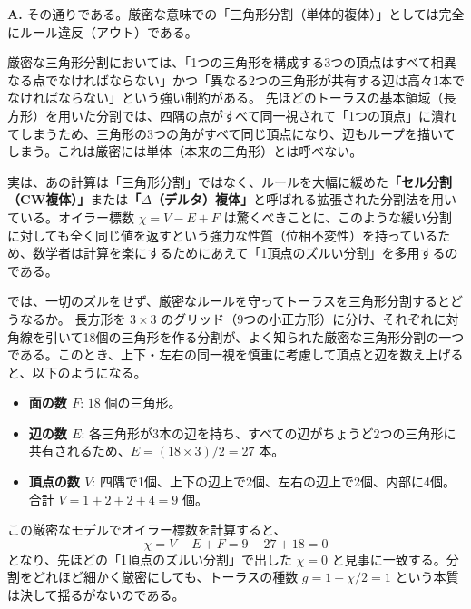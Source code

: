 \begin{Q}
\textbf{A.} その通りである。厳密な意味での「三角形分割（単体的複体）」としては完全にルール違反（アウト）である。

厳密な三角形分割においては、「1つの三角形を構成する3つの頂点はすべて相異なる点でなければならない」かつ「異なる2つの三角形が共有する辺は高々1本でなければならない」という強い制約がある。
先ほどのトーラスの基本領域（長方形）を用いた分割では、四隅の点がすべて同一視されて「1つの頂点」に潰れてしまうため、三角形の3つの角がすべて同じ頂点になり、辺もループを描いてしまう。これは厳密には単体（本来の三角形）とは呼べない。

実は、あの計算は「三角形分割」ではなく、ルールを大幅に緩めた\textbf{「セル分割（CW複体）」}または\textbf{「$\Delta$（デルタ）複体」}と呼ばれる拡張された分割法を用いている。オイラー標数 $\chi = V - E + F$ は驚くべきことに、このような緩い分割に対しても全く同じ値を返すという強力な性質（位相不変性）を持っているため、数学者は計算を楽にするためにあえて「1頂点のズルい分割」を多用するのである。



では、一切のズルをせず、厳密なルールを守ってトーラスを三角形分割するとどうなるか。
長方形を $3 \times 3$ のグリッド（9つの小正方形）に分け、それぞれに対角線を引いて18個の三角形を作る分割が、よく知られた厳密な三角形分割の一つである。このとき、上下・左右の同一視を慎重に考慮して頂点と辺を数え上げると、以下のようになる。
\begin{itemize}
    \item \textbf{面の数 $F$}: $18$ 個の三角形。
    \item \textbf{辺の数 $E$}: 各三角形が3本の辺を持ち、すべての辺がちょうど2つの三角形に共有されるため、$E = (18 \times 3) / 2 = 27$ 本。
    \item \textbf{頂点の数 $V$}: 四隅で1個、上下の辺上で2個、左右の辺上で2個、内部に4個。合計 $V = 1 + 2 + 2 + 4 = 9$ 個。
\end{itemize}
この厳密なモデルでオイラー標数を計算すると、
\[
\chi = V - E + F = 9 - 27 + 18 = 0
\]
となり、先ほどの「1頂点のズルい分割」で出した $\chi = 0$ と見事に一致する。分割をどれほど細かく厳密にしても、トーラスの種数 $g = 1 - \chi/2 = 1$ という本質は決して揺るがないのである。
\end{Q}

